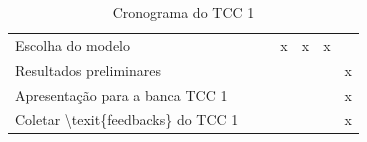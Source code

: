 \begin{table}[h]
\begin{tabular}{@{}lcccccc@{}}
		Escolha do modelo                                   &                         &                         & x                       & x                       & x                       &                         \\
		Resultados preliminares                             &                         &                         &                         &                         &                         & x                       \\
		Apresentação para a banca TCC 1                     &                         &                         &                         &                         &                         & x                       \\
		Coletar \textbackslash{}texit\{feedbacks\} do TCC 1 &                         &                         &                         &                         &                         & x                       \\ \bottomrule
	\end{tabular}
	\caption{Cronograma do TCC 1}
	\label{table:CronogramaTCC1}
\end{table}

